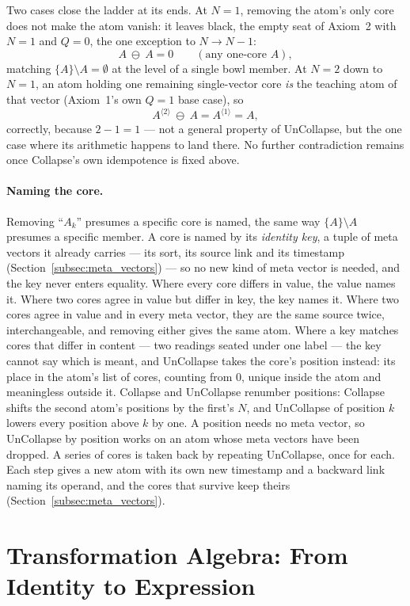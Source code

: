 \documentclass[12pt, a4paper]{article}
\begin{document}
Two cases close the ladder at its ends. At $N=1$, removing the atom's
only core does not make the atom vanish: it leaves black, the empty
seat of Axiom~2 with $N=1$ and $Q=0$, the one exception to
$N\to N-1$:
\[
A\ \ominus\ A = 0 \qquad (\text{any one-core } A),
\]
matching $\{A\}\setminus A=\emptyset$ at the level of a single bowl
member. At $N=2$ down to $N=1$, an atom holding one remaining single-vector
core \emph{is} the teaching atom of that vector (Axiom~1's own $Q=1$
base case), so
\[
A^{\langle 2\rangle}\ \ominus\ A = A^{\langle 1\rangle} = A,
\]
correctly, because $2-1=1$ --- not a general property of UnCollapse,
but the one case where its arithmetic happens to land there. No
further contradiction remains once Collapse's own idempotence is
fixed above.

\paragraph{Naming the core.} Removing ``$A_k$'' presumes a specific core is named, the same way $\{A\}\setminus A$ presumes a specific member. A core is named by its \emph{identity key}, a tuple of meta vectors it already carries --- its sort, its source link and its timestamp (Section~\ref{subsec:meta_vectors}) --- so no new kind of meta vector is needed, and the key never enters equality. Where every core differs in value, the value names it. Where two cores agree in value but differ in key, the key names it. Where two cores agree in value and in every meta vector, they are the same source twice, interchangeable, and removing either gives the same atom. Where a key matches cores that differ in content --- two readings seated under one label --- the key cannot say which is meant, and UnCollapse takes the core's position instead: its place in the atom's list of cores, counting from $0$, unique inside the atom and meaningless outside it. Collapse and UnCollapse renumber positions: Collapse shifts the second atom's positions by the first's $N$, and UnCollapse of position $k$ lowers every position above $k$ by one. A position needs no meta vector, so UnCollapse by position works on an atom whose meta vectors have been dropped. A series of cores is taken back by repeating UnCollapse, once for each. Each step gives a new atom with its own new timestamp and a backward link naming its operand, and the cores that survive keep theirs (Section~\ref{subsec:meta_vectors}).


\section{Transformation Algebra: From Identity to Expression}
\label{sec:transformation_algebra}
\end{document}
